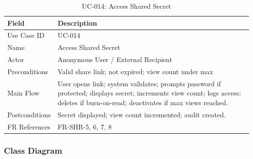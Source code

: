 \documentclass[12pt,a4paper]{article}
\begin{document}
\begin{table}[H]
  \centering
  \small
  \caption{UC-014: Access Shared Secret}
  \begin{tabular}{@{}p{2.4cm}>{\raggedright\arraybackslash}p{10.2cm}@{}}
    \toprule
    \textbf{Field} & \textbf{Description}                                                                                                                                                              \\
    \midrule
    Use Case ID    & UC-014                                                                                                                                                                            \\
    \hline
    Name           & Access Shared Secret                                                                                                                                                              \\
    \hline
    Actor          & Anonymous User / External Recipient                                                                                                                                               \\
    \hline
    Preconditions  & Valid share link; not expired; view count under max                                                                                                                               \\
    \hline
    Main Flow      & User opens link; system validates; prompts password if protected; displays secret; increments view count; logs access; deletes if burn-on-read; deactivates if max views reached. \\
    \hline
    Postconditions & Secret displayed; view count incremented; audit created.                                                                                                                          \\
    \hline
    FR References  & FR-SHR-5, 6, 7, 8                                                                                                                                                                 \\
    \bottomrule
  \end{tabular}
\end{table}

\subsubsection{Class Diagram}
\end{document}
